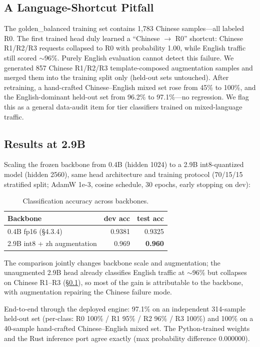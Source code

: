 \documentclass[11pt]{article}
\begin{document}
\subsection{A Language-Shortcut Pitfall}
\label{sec:language-shortcut}

The golden\_balanced training set contains 1,783 Chinese samples---all
labeled R0. The first trained head duly learned a ``Chinese $\to$ R0''
shortcut: Chinese R1/R2/R3 requests collapsed to R0 with probability 1.00,
while English traffic still scored $\sim$96\%. Purely English evaluation
cannot detect this failure. We generated 857 Chinese R1/R2/R3
template-composed augmentation samples and merged them into the training
split only (held-out sets untouched). After retraining, a hand-crafted
Chinese--English mixed set rose from 45\% to 100\%, and the English-dominant
held-out set from 96.2\% to 97.1\%---no regression. We flag this as a
general data-audit item for tier classifiers trained on mixed-language
traffic.

\subsection{Results at 2.9B}
\label{sec:results-29b}

Scaling the frozen backbone from 0.4B (hidden 1024) to a 2.9B int8-quantized
model (hidden 2560), same head architecture and training protocol (70/15/15
stratified split; AdamW 1e-3, cosine schedule, 30 epochs, early stopping on
dev):

\begin{table}[h]
\centering
\begin{tabular}{lrr}
\toprule
Backbone & dev acc & test acc \\
\midrule
0.4B fp16 (\S4.3.4) & 0.9381 & 0.9325 \\
2.9B int8 + zh augmentation & 0.969 & \textbf{0.960} \\
\bottomrule
\end{tabular}
\caption{Classification accuracy across backbones.}
\end{table}

The comparison jointly changes backbone scale and augmentation; the
unaugmented 2.9B head already classifies English traffic at $\sim$96\% but
collapses on Chinese R1--R3 (\S\ref{sec:language-shortcut}), so most of the
gain is attributable to the backbone, with augmentation repairing the
Chinese failure mode.

End-to-end through the deployed engine: 97.1\% on an independent 314-sample
held-out set (per-class: R0 100\% / R1 95\% / R2 96\% / R3 100\%) and 100\%
on a 40-sample hand-crafted Chinese--English mixed set. The Python-trained
weights and the Rust inference port agree exactly (max probability
difference 0.000000).
\end{document}
